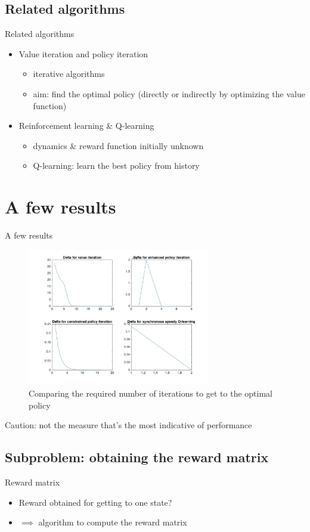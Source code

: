 \documentclass{beamer}
\begin{document}
\subsection{Related algorithms}
\begin{frame}{Related algorithms}
\begin{itemize}
\item Value iteration and policy iteration
\begin{itemize}
\item iterative algorithms
\item aim: find the optimal policy (directly or indirectly by optimizing the value function)
\end{itemize}
\item Reinforcement learning \& Q-learning
\begin{itemize}
\item dynamics \& reward function initially unknown
\item Q-learning: learn the best policy from history
\end{itemize}
\end{itemize}
\end{frame}

\section{A few results}
\begin{frame}{A few results}
\begin{figure}
\begin{center}
\includegraphics[height=6cm]{deltas.jpg}
\caption{Comparing the required number of iterations to get to the optimal policy}
\end{center}
\end{figure}
Caution: not the measure that's the most indicative of performance
\end{frame}

\subsection{Subproblem: obtaining the reward matrix}
\begin{frame}{Reward matrix}
\begin{itemize}
\item Reward obtained for getting to one state?
\item $\implies$ algorithm to compute the reward matrix
\end{itemize}
\end{frame}
\end{document}
